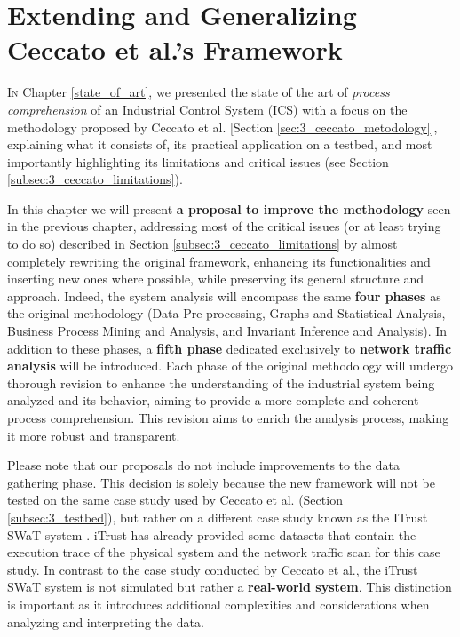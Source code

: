 \chapter{Extending and Generalizing Ceccato et al.’s Framework}
\label{chap:proposal}

\linenumbers
\lettrine[lines=2]{I}{n} Chapter \ref{state_of_art}, we presented the state of the art of \textit{process comprehension} of an Industrial Control System (ICS) with a focus on the methodology proposed by Ceccato et al. \cite{ceccato}[Section \ref{sec:3_ceccato_metodology}], explaining what it consists of, its practical application on a testbed, and most importantly highlighting its limitations and critical issues (see Section \ref{subsec:3_ceccato_limitations}).

\bigskip
In this chapter we will present \textbf{a proposal to improve the methodology} seen in the previous chapter, addressing most of the critical issues (or at least trying to do so) described in Section \ref{subsec:3_ceccato_limitations} by almost completely rewriting the original framework, enhancing its functionalities and inserting new ones where possible, while preserving its general structure and approach. Indeed, the system analysis will encompass the same \textbf{four phases} as the original methodology (Data Pre-processing, Graphs and Statistical Analysis, Business Process Mining and Analysis, and Invariant Inference and Analysis). In addition to these phases, a \textbf{fifth phase} dedicated exclusively to \textbf{network traffic analysis} will be introduced. Each phase of the original methodology will undergo thorough revision to enhance the understanding of the industrial system being analyzed and its behavior, aiming to provide a more complete and coherent process comprehension. This revision aims to enrich the analysis process, making it more robust and transparent.

\bigskip
Please note that our proposals do not include improvements to the data gathering phase. This decision is solely because the new framework will not be tested on the same case study used by Ceccato et al. (Section \ref{subsec:3_testbed}), but rather on a different case study known as the ITrust SWaT system \cite{swat_home}. iTrust has already provided some datasets that contain the execution trace of the physical system and the network traffic scan for this case study. In contrast to the case study conducted by Ceccato et al., the iTrust SWaT system is not simulated but rather a \textbf{real-world system}. This distinction is important as it introduces additional complexities and considerations when analyzing and interpreting the data. 

